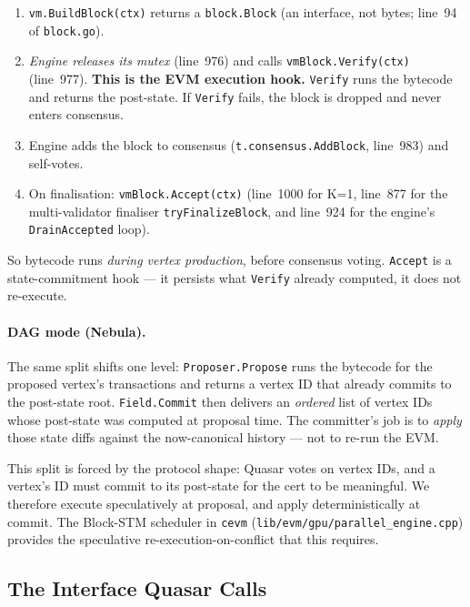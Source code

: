 \begin{enumerate}
  \item \texttt{vm.BuildBlock(ctx)} returns a \texttt{block.Block} (an
    interface, not bytes; line~94 of \texttt{block.go}).
  \item \emph{Engine releases its mutex} (line~976) and calls
    \texttt{vmBlock.Verify(ctx)} (line~977). \textbf{This is the EVM
    execution hook.} \texttt{Verify} runs the bytecode and returns the
    post-state. If \texttt{Verify} fails, the block is dropped and never
    enters consensus.
  \item Engine adds the block to consensus
    (\texttt{t.consensus.AddBlock}, line~983) and self-votes.
  \item On finalisation: \texttt{vmBlock.Accept(ctx)}
    (line~1000 for K=1, line~877 for the multi-validator finaliser
    \texttt{tryFinalizeBlock}, and line~924 for the engine's
    \texttt{DrainAccepted} loop).
\end{enumerate}

So bytecode runs \emph{during vertex production}, before consensus voting.
\texttt{Accept} is a state-commitment hook --- it persists what
\texttt{Verify} already computed, it does not re-execute.

\paragraph{DAG mode (Nebula).}
The same split shifts one level: \texttt{Proposer.Propose} runs the
bytecode for the proposed vertex's transactions and returns a vertex ID
that already commits to the post-state root. \texttt{Field.Commit} then
delivers an \emph{ordered} list of vertex IDs whose post-state was
computed at proposal time. The committer's job is to \emph{apply} those
state diffs against the now-canonical history --- not to re-run the EVM.

This split is forced by the protocol shape: Quasar votes on vertex IDs,
and a vertex's ID must commit to its post-state for the cert to be
meaningful. We therefore execute speculatively at proposal, and apply
deterministically at commit. The Block-STM scheduler in \texttt{cevm}
(\texttt{lib/evm/gpu/parallel\_engine.cpp}) provides the speculative
re-execution-on-conflict that this requires.

\subsection{The Interface Quasar Calls}
\label{sec:cevm-interface}

